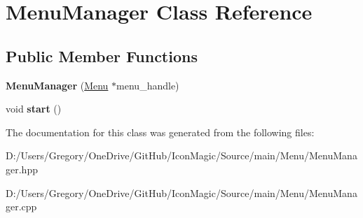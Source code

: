 \hypertarget{class_menu_manager}{}\section{Menu\+Manager Class Reference}
\label{class_menu_manager}
\subsection*{Public Member Functions}
\begin{DoxyCompactItemize}
\item 
\hypertarget{class_menu_manager_a10697cb589a5f8e0192e9521435d0c67}{}{\bfseries Menu\+Manager} (\hyperlink{class_menu}{Menu} $\ast$menu\+\_\+handle)\label{class_menu_manager_a10697cb589a5f8e0192e9521435d0c67}

\item 
\hypertarget{class_menu_manager_ae6d30361fb03f8957d2e8e363ec0e4f3}{}void {\bfseries start} ()\label{class_menu_manager_ae6d30361fb03f8957d2e8e363ec0e4f3}

\end{DoxyCompactItemize}


The documentation for this class was generated from the following files\+:\begin{DoxyCompactItemize}
\item 
D\+:/\+Users/\+Gregory/\+One\+Drive/\+Git\+Hub/\+Icon\+Magic/\+Source/main/\+Menu/Menu\+Manager.\+hpp\item 
D\+:/\+Users/\+Gregory/\+One\+Drive/\+Git\+Hub/\+Icon\+Magic/\+Source/main/\+Menu/Menu\+Manager.\+cpp\end{DoxyCompactItemize}
